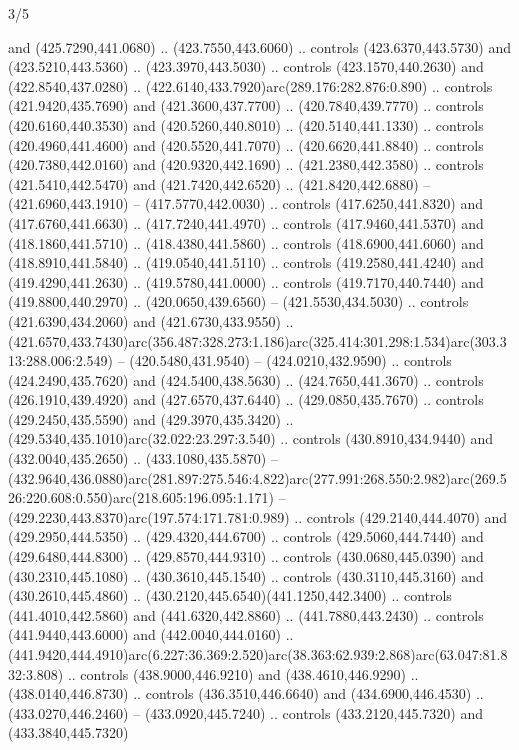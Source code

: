 \begin{flagdescription}{3/5}
\begin{scope}[shift={(0.5\flaglength,0.5\flagwidth)},scale=\flagwidth/510]
\begin{scope}[y=0.80pt, x=0.80pt, yscale=-1.06, xscale=1.06,yshift=-240pt,xshift=-400pt]
\begin{scope}[cm={{0.83333,0.0,0.0,0.83333,(154.64672,48.64761)}}]
\begin{scope}[cm={{0.93334,0.0,0.0,0.93334,(-4.86471,22.64035)}}]
\begin{scope}[draw=black]
  and (425.7290,441.0680) .. (423.7550,443.6060) .. controls (423.6370,443.5730)
  and (423.5210,443.5360) .. (423.3970,443.5030) .. controls (423.1570,440.2630)
  and (422.8540,437.0280) .. (422.6140,433.7920)arc(289.176:282.876:0.890) ..
  controls (421.9420,435.7690) and (421.3600,437.7700) .. (420.7840,439.7770) ..
  controls (420.6160,440.3530) and (420.5260,440.8010) .. (420.5140,441.1330) ..
  controls (420.4960,441.4600) and (420.5520,441.7070) .. (420.6620,441.8840) ..
  controls (420.7380,442.0160) and (420.9320,442.1690) .. (421.2380,442.3580) ..
  controls (421.5410,442.5470) and (421.7420,442.6520) .. (421.8420,442.6880) --
  (421.6960,443.1910) -- (417.5770,442.0030) .. controls (417.6250,441.8320) and
  (417.6760,441.6630) .. (417.7240,441.4970) .. controls (417.9460,441.5370) and
  (418.1860,441.5710) .. (418.4380,441.5860) .. controls (418.6900,441.6060) and
  (418.8910,441.5840) .. (419.0540,441.5110) .. controls (419.2580,441.4240) and
  (419.4290,441.2630) .. (419.5780,441.0000) .. controls (419.7170,440.7440) and
  (419.8800,440.2970) .. (420.0650,439.6560) -- (421.5530,434.5030) .. controls
  (421.6390,434.2060) and (421.6730,433.9550) ..
  (421.6570,433.7430)arc(356.487:328.273:1.186)arc(325.414:301.298:1.534)arc(303.313:288.006:2.549)
  -- (420.5480,431.9540) -- (424.0210,432.9590) .. controls (424.2490,435.7620)
  and (424.5400,438.5630) .. (424.7650,441.3670) .. controls (426.1910,439.4920)
  and (427.6570,437.6440) .. (429.0850,435.7670) .. controls (429.2450,435.5590)
  and (429.3970,435.3420) .. (429.5340,435.1010)arc(32.022:23.297:3.540) ..
  controls (430.8910,434.9440) and (432.0040,435.2650) .. (433.1080,435.5870) --
  (432.9640,436.0880)arc(281.897:275.546:4.822)arc(277.991:268.550:2.982)arc(269.526:220.608:0.550)arc(218.605:196.095:1.171)
  -- (429.2230,443.8370)arc(197.574:171.781:0.989) .. controls
  (429.2140,444.4070) and (429.2950,444.5350) .. (429.4320,444.6700) .. controls
  (429.5060,444.7440) and (429.6480,444.8300) .. (429.8570,444.9310) .. controls
  (430.0680,445.0390) and (430.2310,445.1080) .. (430.3610,445.1540) .. controls
  (430.3110,445.3160) and (430.2610,445.4860) ..
  (430.2120,445.6540)(441.1250,442.3400) .. controls (441.4010,442.5860) and
  (441.6320,442.8860) .. (441.7880,443.2430) .. controls (441.9440,443.6000) and
  (442.0040,444.0160) ..
  (441.9420,444.4910)arc(6.227:36.369:2.520)arc(38.363:62.939:2.868)arc(63.047:81.832:3.808)
  .. controls (438.9000,446.9210) and (438.4610,446.9290) .. (438.0140,446.8730)
  .. controls (436.3510,446.6640) and (434.6900,446.4530) .. (433.0270,446.2460)
  -- (433.0920,445.7240) .. controls (433.2120,445.7320) and (433.3840,445.7320)

\end{scope}
\end{scope}
\end{scope}
\end{scope}
\end{scope}
\end{flagdescription}
